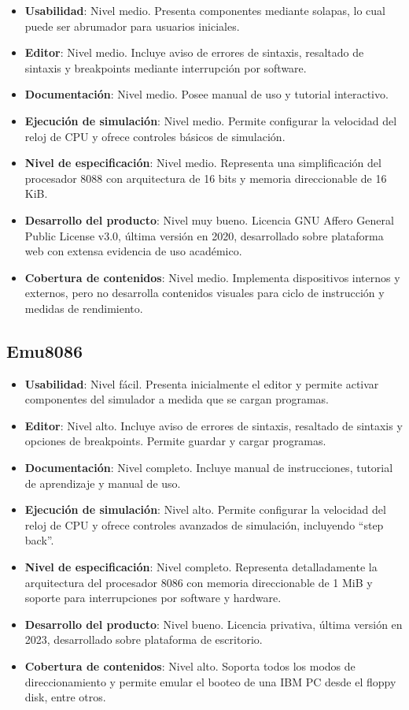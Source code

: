 \documentclass[12pt,twoside]{templates/unerthesis}
\providecommand{\tightlist}{%
  \setlength{\itemsep}{0pt}\setlength{\parskip}{0pt}}
\begin{document}
\begin{itemize}
\tightlist
\item
  \textbf{Usabilidad}: Nivel medio. Presenta componentes mediante solapas, lo cual puede ser abrumador para usuarios iniciales.
\item
  \textbf{Editor}: Nivel medio. Incluye aviso de errores de sintaxis, resaltado de sintaxis y breakpoints mediante interrupción por software.
\item
  \textbf{Documentación}: Nivel medio. Posee manual de uso y tutorial interactivo.
\item
  \textbf{Ejecución de simulación}: Nivel medio. Permite configurar la velocidad del reloj de CPU y ofrece controles básicos de simulación.
\item
  \textbf{Nivel de especificación}: Nivel medio. Representa una simplificación del procesador 8088 con arquitectura de 16 bits y memoria direccionable de 16 KiB.
\item
  \textbf{Desarrollo del producto}: Nivel muy bueno. Licencia GNU Affero General Public License v3.0, última versión en 2020, desarrollado sobre plataforma web con extensa evidencia de uso académico.
\item
  \textbf{Cobertura de contenidos}: Nivel medio. Implementa dispositivos internos y externos, pero no desarrolla contenidos visuales para ciclo de instrucción y medidas de rendimiento.
\end{itemize}

\hypertarget{emu8086}{%
\subsection{Emu8086}\label{emu8086}}

\begin{itemize}
\tightlist
\item
  \textbf{Usabilidad}: Nivel fácil. Presenta inicialmente el editor y permite activar componentes del simulador a medida que se cargan programas.
\item
  \textbf{Editor}: Nivel alto. Incluye aviso de errores de sintaxis, resaltado de sintaxis y opciones de breakpoints. Permite guardar y cargar programas.
\item
  \textbf{Documentación}: Nivel completo. Incluye manual de instrucciones, tutorial de aprendizaje y manual de uso.
\item
  \textbf{Ejecución de simulación}: Nivel alto. Permite configurar la velocidad del reloj de CPU y ofrece controles avanzados de simulación, incluyendo ``step back''.
\item
  \textbf{Nivel de especificación}: Nivel completo. Representa detalladamente la arquitectura del procesador 8086 con memoria direccionable de 1 MiB y soporte para interrupciones por software y hardware.
\item
  \textbf{Desarrollo del producto}: Nivel bueno. Licencia privativa, última versión en 2023, desarrollado sobre plataforma de escritorio.
\item
  \textbf{Cobertura de contenidos}: Nivel alto. Soporta todos los modos de direccionamiento y permite emular el booteo de una IBM PC desde el floppy disk, entre otros.
\end{itemize}
\end{document}
